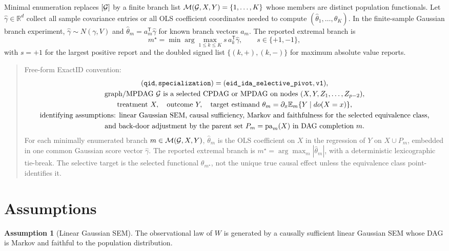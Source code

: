 \documentclass[11pt]{article}
\newcommand{\E}{\mathbb{E}}
\newcommand{\transpose}{\mathsf{T}}
\newcommand{\R}{\mathbb{R}}
\theoremstyle{definition}
\newtheorem{assumption}{Assumption}
\theoremstyle{plain}
\theoremstyle{remark}
\begin{document}
Minimal enumeration replaces \([{\cal G}]\) by a finite branch list \({\cal M}({\cal G},X,Y)=\{1,\ldots,K\}\) whose members are distinct population functionals. Let \(\hat\gamma\in\R^d\) collect all sample covariance entries or all OLS coefficient coordinates needed to compute \((\hat\theta_1,\ldots,\hat\theta_K)\). In the finite-sample Gaussian branch experiment, \(\hat\gamma\sim N(\gamma,V)\) and \(\hat\theta_m=a_m^\transpose\hat\gamma\) for known branch vectors \(a_m\). The reported extremal branch is
\[
m^\star=\min\arg\max_{1\le k\le K} s\,a_k^\transpose\hat\gamma,\qquad s\in\{+1,-1\},
\]
with \(s=+1\) for the largest positive report and the doubled signed list \(\{(k,+),(k,-)\}\) for maximum absolute value reports.

\begin{quote}
Free-form ExactID convention:
\[
\begin{gathered}
(\texttt{qid},\texttt{specialization})=(\texttt{eid\_ida\_selective\_pivot},\texttt{v1}),\\
\text{graph/MPDAG }{\cal G}\text{ is a selected CPDAG or MPDAG on nodes }(X,Y,Z_1,\ldots,Z_{p-2}),\\
\text{treatment }X,\quad \text{outcome }Y,\quad
\text{target estimand }\theta_m=\partial_x \E_m\{Y\mid do(X=x)\},\\
\text{identifying assumptions: linear Gaussian SEM, causal sufficiency, Markov and faithfulness for the selected equivalence class,}\\
\text{and back-door adjustment by the parent set }P_m=\operatorname{pa}_m(X)\text{ in DAG completion }m.
\end{gathered}
\]
For each minimally enumerated branch \(m\in{\cal M}({\cal G},X,Y)\), \(\hat\theta_m\) is the OLS coefficient on \(X\) in the regression of \(Y\) on \(X\cup P_m\), embedded in one common Gaussian score vector \(\hat\gamma\). The reported extremal branch is \(m^\star=\arg\max_m |\hat\theta_m|\), with a deterministic lexicographic tie-break. The selective target is the selected functional \(\theta_{m^\star}\), not the unique true causal effect unless the equivalence class point-identifies it.
\end{quote}

\section{Assumptions}
\begin{assumption}[Linear Gaussian SEM]\label{ass:linear-gaussian}
The observational law of \(W\) is generated by a causally sufficient linear Gaussian SEM whose DAG is Markov and faithful to the population distribution.
\end{assumption}
\end{document}
